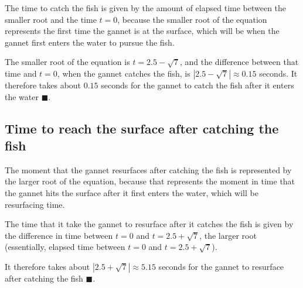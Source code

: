 \documentclass[12pt]{article}
\begin{document}
The time to catch the fish is given by the amount of elapsed time between the smaller root and the time $t = 0$, because the smaller root of the equation represents the first time the gannet is at the surface, which will be when the gannet first enters the water to pursue the fish.

The smaller root of the equation is $t = 2.5 - \sqrt{7}$, and the difference between that time and $t = 0$, when the gannet catches the fish, is $\left|2.5 - \sqrt{7}\right| \approx 0.15$ seconds. It therefore takes about $0.15$ seconds for the gannet to catch the fish after it enters the water $\blacksquare$.

\subsection{Time to reach the surface after catching the fish}

The moment that the gannet resurfaces after catching the fish is represented by the larger root of the equation, because that represents the moment in time that the gannet hits the surface after it first enters the water, which will be resurfacing time.

The time that it take the gannet to resurface after it catches the fish is given by the difference in time between $t = 0$ and $t = 2.5 + \sqrt{7}$, the larger root (essentially, elapsed time between $t = 0$ and $t = 2.5 + \sqrt{7}$).

It therefore takes about $\left| 2.5 + \sqrt{7} \right| \approx 5.15$ seconds for the gannet to resurface after catching the fish $\blacksquare$.
\end{document}
